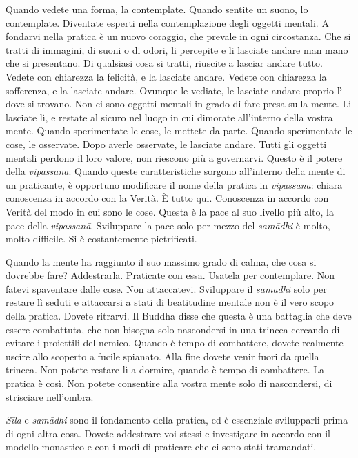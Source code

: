 Quando vedete una forma, la contemplate. Quando sentite un suono, lo
contemplate. Diventate esperti nella contemplazione degli oggetti
mentali. A fondarvi nella pratica è un nuovo coraggio, che prevale in
ogni circostanza. Che si tratti di immagini, di suoni o di odori, li
percepite e li lasciate andare man mano che si presentano. Di qualsiasi
cosa si tratti, riuscite a lasciar andare tutto. Vedete con chiarezza la
felicità, e la lasciate andare. Vedete con chiarezza la sofferenza, e la
lasciate andare. Ovunque le vediate, le lasciate andare proprio lì dove
si trovano. Non ci sono oggetti mentali in grado di fare presa sulla
mente. Li lasciate lì, e restate al sicuro nel luogo in cui dimorate
all'interno della vostra mente. Quando sperimentate le cose, le mettete
da parte. Quando sperimentate le cose, le osservate. Dopo averle
osservate, le lasciate andare. Tutti gli oggetti mentali perdono il loro
valore, non riescono più a governarvi. Questo è il potere della
\emph{vipassanā}. Quando queste caratteristiche sorgono all'interno
della mente di un praticante, è opportuno modificare il nome della
pratica in \emph{vipassanā}: chiara conoscenza in accordo con la Verità.
È tutto qui. Conoscenza in accordo con Verità del modo in cui sono le
cose. Questa è la pace al suo livello più alto, la pace della
\emph{vipassanā}. Sviluppare la pace solo per mezzo del \emph{samādhi} è
molto, molto difficile. Si è costantemente pietrificati.

Quando la mente ha raggiunto il suo massimo grado di calma, che cosa si
dovrebbe fare? Addestrarla. Praticate con essa. Usatela per contemplare.
Non fatevi spaventare dalle cose. Non attaccatevi. Sviluppare il
\emph{samādhi} solo per restare lì seduti e attaccarsi a stati di
beatitudine mentale non è il vero scopo della pratica. Dovete ritrarvi.
Il Buddha disse che questa è una battaglia che deve essere combattuta,
che non bisogna solo nascondersi in una trincea cercando di evitare i
proiettili del nemico. Quando è tempo di combattere, dovete realmente
uscire allo scoperto a fucile spianato. Alla fine dovete venir fuori da
quella trincea. Non potete restare lì a dormire, quando è tempo di
combattere. La pratica è così. Non potete consentire alla vostra mente
solo di nascondersi, di strisciare nell'ombra.

\emph{Sīla} e \emph{samādhi} sono il fondamento della pratica, ed è
essenziale svilupparli prima di ogni altra cosa. Dovete addestrare voi
stessi e investigare in accordo con il modello monastico e con i modi di
praticare che ci sono stati tramandati.

